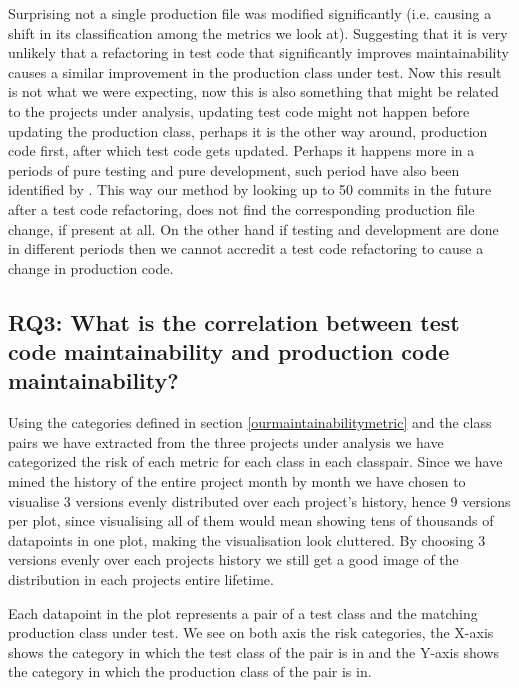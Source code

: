 Surprising not a single production file was modified significantly (i.e. causing a shift in its classification among the metrics we look at). Suggesting that it is very unlikely that a refactoring in test code that significantly improves maintainability causes a similar improvement in the production class under test. Now this result is not what we were expecting, now this is also something that might be related to the projects under analysis, updating test code might not happen before updating the production class, perhaps it is the other way around, production code first, after which test code gets updated. Perhaps it happens more in a periods of pure testing and pure development, such period have also been identified by \cite{zaidman2008mining}. This way our method by looking up to 50 commits in the future after a test code refactoring, does not find the corresponding production file change, if present at all. On the other hand if testing and development are done in different periods then we cannot accredit a test code refactoring to cause a change in production code.

\subsection*{RQ3: What is the correlation between test code maintainability and production code maintainability?}\label{maintainability:correlation}
Using the categories defined in section \ref{ourmaintainabilitymetric} and the class pairs we have extracted from the three projects under analysis we have categorized the risk of each metric for each class in each classpair. Since we have mined the history of the entire project month by month we have chosen to visualise 3 versions evenly distributed over each project's history, hence 9 versions per plot, since visualising all of them would mean showing tens of thousands of datapoints in one plot, making the visualisation look cluttered. By choosing 3 versions evenly over each projects history we still get a good image of the distribution in each projects entire lifetime.

Each datapoint in the plot represents a pair of a test class and the matching production class under test. We see on both axis the risk categories, the X-axis shows the category in which the test class of the pair is in and the Y-axis shows the category in which the production class of the pair is in.

